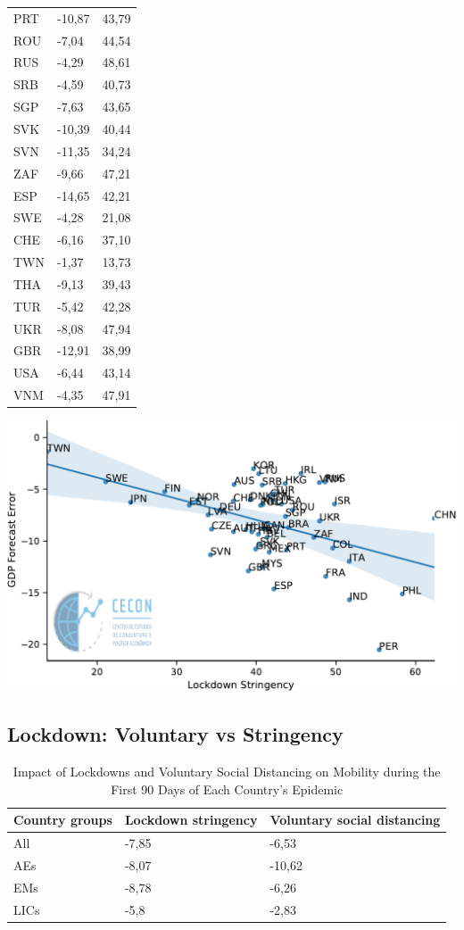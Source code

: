 \documentclass{SelfArx}
\begin{document}
\begin{table}[htbp]
\begin{tabular}{lll}
PRT & -10,87 & 43,79\\
ROU & -7,04 & 44,54\\
RUS & -4,29 & 48,61\\
SRB & -4,59 & 40,73\\
SGP & -7,63 & 43,65\\
SVK & -10,39 & 40,44\\
SVN & -11,35 & 34,24\\
ZAF & -9,66 & 47,21\\
ESP & -14,65 & 42,21\\
SWE & -4,28 & 21,08\\
CHE & -6,16 & 37,10\\
TWN & -1,37 & 13,73\\
THA & -9,13 & 39,43\\
TUR & -5,42 & 42,28\\
UKR & -8,08 & 47,94\\
GBR & -12,91 & 38,99\\
USA & -6,44 & 43,14\\
VNM & -4,35 & 47,91\\
\hline
\end{tabular}
\end{table}


\begin{center}
\includegraphics[width=.9\linewidth]{./figs/IMF/GDP_Lockdown.pdf}
\end{center}



\subsection*{Lockdown: Voluntary vs Stringency}
\label{sec:org6996447}

\begin{table}[htbp]
\caption{\label{Vol_String}Impact of Lockdowns and Voluntary Social Distancing on Mobility during the First 90 Days of Each Country’s Epidemic}
\centering
\begin{tabular}{lll}
Country groups & Lockdown stringency & Voluntary social distancing\\
\hline
All & -7,85 & -6,53\\
AEs & -8,07 & -10,62\\
EMs & -8,78 & -6,26\\
LICs & -5,8 & -2,83\\
\hline
\end{tabular}
\end{table}
\end{document}
